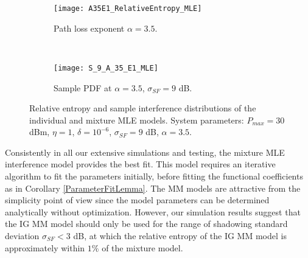 \documentclass[12pt, draftclsnofoot, onecolumn]{IEEEtran}
\theoremstyle{plain}
\begin{document}
\fi
\begin{figure*}[t!]
    \centering
    \begin{subfigure}[t]{0.45\textwidth}
        \centering
        \texttt{[image: A35E1\_RelativeEntropy\_MLE]}
        \vspace{-0.16in}
        \caption{{\small Path loss exponent $\alpha=3.5$.}}
        \label{REAE3a}
    \end{subfigure}%
    ~ 
    \begin{subfigure}[t]{0.45\textwidth}
        \centering
        \texttt{[image: S\_9\_A\_35\_E1\_MLE]}
        \vspace{-0.16in}
        \caption{{\small Sample PDF at $\alpha=3.5$, $\sigma_{SF}=9$ dB.}}
        \label{REAE3b}
    \end{subfigure}\vspace{-0.4in}
    \caption{{\small Relative entropy and sample interference distributions of the individual and mixture MLE models. System parameters: $P_{max}=30$ dBm, $\eta=1$, $\delta=10^{-6}$, $\sigma_{SF}=9$ dB, $\alpha=3.5$.}} \label{REAE3}
	\vspace{-0.45in}
	\vspace{-.15in}
\end{figure*}

Consistently in all our extensive simulations and testing, the mixture MLE interference model provides the best fit. This model requires an iterative algorithm to fit the parameters initially, before fitting the functional coefficients as in Corollary \ref{ParameterFitLemma}. The MM models are attractive from the simplicity point of view since the model parameters can be determined analytically without optimization. %
{\color{black} However, our simulation results suggest that the IG MM model should only be used for the range of shadowing standard deviation $\sigma_{SF}<3$ dB, at which the relative entropy of the IG MM model is approximately within $1\%$ of the mixture model.}
%
\end{document}

